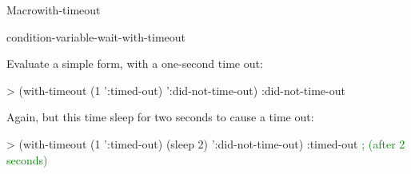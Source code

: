 \begin{functiondoc}{Macro}{with-timeout}{\code{(} 
    \superstar{}\code{)}
    \superstar{} 
    \returns{} \superstar}
\begin{alsos}{condition-variable-wait-with-timeout}
\end{alsos}

\fnexamples
Evaluate a simple form, with a one-second time out:
\begin{example}
> (with-timeout (1 ':timed-out) 
     ':did-not-time-out)
:did-not-time-out
\end{example}

Again, but this time sleep for two seconds to cause a time out:
\begin{example}
> (with-timeout (1 ':timed-out)
     (sleep 2) 
     ':did-not-time-out)
:timed-out              \textrm{\textcolor{green}{; (after 2 seconds)}}
\end{example}

\end{functiondoc}


